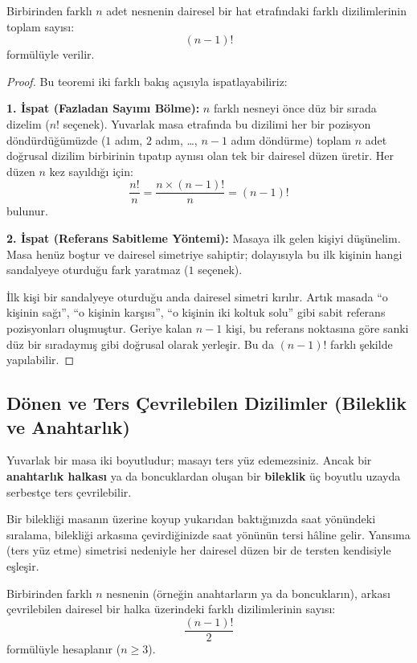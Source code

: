 \begin{theorem}
Birbirinden farklı $n$ adet nesnenin dairesel bir hat etrafındaki farklı dizilimlerinin toplam sayısı:
\[ (n - 1)! \]
formülüyle verilir.
\end{theorem}
\begin{proof}
Bu teoremi iki farklı bakış açısıyla ispatlayabiliriz:

\textbf{1. İspat (Fazladan Sayımı Bölme):}
$n$ farklı nesneyi önce düz bir sırada dizelim ($n!$ seçenek). Yuvarlak masa etrafında bu dizilimi her bir pozisyon döndürdüğümüzde ($1$ adım, $2$ adım, \dots, $n-1$ adım döndürme) toplam $n$ adet doğrusal dizilim birbirinin tıpatıp aynısı olan tek bir dairesel düzen üretir. Her düzen $n$ kez sayıldığı için:
\[ \frac{n!}{n} = \frac{n \times (n-1)!}{n} = (n-1)! \]
bulunur.

\textbf{2. İspat (Referans Sabitleme Yöntemi):}
Masaya ilk gelen kişiyi düşünelim. Masa henüz boştur ve dairesel simetriye sahiptir; dolayısıyla bu ilk kişinin hangi sandalyeye oturduğu fark yaratmaz ($1$ seçenek). 

İlk kişi bir sandalyeye oturduğu anda dairesel simetri kırılır. Artık masada ``o kişinin sağı'', ``o kişinin karşısı'', ``o kişinin iki koltuk solu'' gibi sabit referans pozisyonları oluşmuştur. Geriye kalan $n-1$ kişi, bu referans noktasına göre sanki düz bir sıradaymış gibi doğrusal olarak yerleşir. Bu da $(n-1)!$ farklı şekilde yapılabilir.
\end{proof}

\subsection{Dönen ve Ters Çevrilebilen Dizilimler (Bileklik ve Anahtarlık)}

Yuvarlak bir masa iki boyutludur; masayı ters yüz edemezsiniz. Ancak bir \textbf{anahtarlık halkası} ya da boncuklardan oluşan bir \textbf{bileklik} üç boyutlu uzayda serbestçe ters çevrilebilir.

Bir bilekliği masanın üzerine koyup yukarıdan baktığınızda saat yönündeki sıralama, bilekliği arkasına çevirdiğinizde saat yönünün tersi hâline gelir. Yansıma (ters yüz etme) simetrisi nedeniyle her dairesel düzen bir de tersten kendisiyle eşleşir.

\begin{theorem}
Birbirinden farklı $n$ nesnenin (örneğin anahtarların ya da boncukların), arkası çevrilebilen dairesel bir halka üzerindeki farklı dizilimlerinin sayısı:
\[ \frac{(n-1)!}{2} \]
formülüyle hesaplanır ($n \ge 3$).
\end{theorem}

